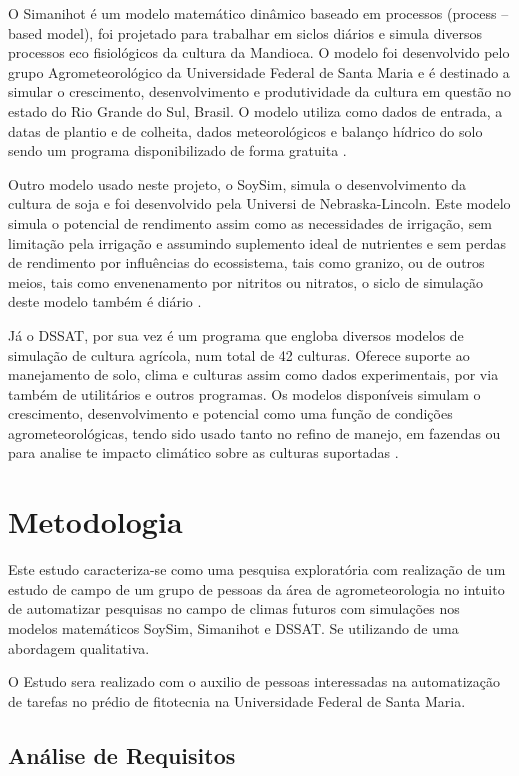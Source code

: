 \documentclass[12pt]{article}
\begin{document}
	O Simanihot é um modelo matemático dinâmico baseado em processos (process – based model), foi projetado para trabalhar em siclos diários e simula diversos processos eco fisiológicos da cultura da Mandioca. O modelo foi desenvolvido pelo grupo Agrometeorológico da Universidade Federal de Santa Maria e é destinado a simular o crescimento, desenvolvimento e produtividade da cultura em questão no estado do Rio Grande do Sul, Brasil. O modelo utiliza como dados de entrada, a datas de plantio e de colheita, dados meteorológicos e balanço hídrico do solo sendo um programa disponibilizado de forma gratuita \cite{Simanihot}.

	Outro modelo usado neste projeto, o SoySim, simula o desenvolvimento da cultura de soja e foi desenvolvido pela Universi de Nebraska-Lincoln. Este modelo simula o potencial de rendimento assim como as necessidades de irrigação, sem limitação pela irrigação e assumindo suplemento ideal de nutrientes e sem perdas de rendimento por influências do ecossistema, tais como granizo, ou de outros meios, tais como envenenamento por nitritos ou nitratos, o siclo de simulação deste modelo também é diário \cite{SoySim}.
	
	Já o DSSAT, por sua vez é um programa que engloba diversos modelos de simulação de cultura agrícola, num total de 42 culturas. Oferece suporte ao manejamento de solo, clima e culturas assim como dados experimentais, por via também de utilitários e outros programas. Os modelos disponíveis simulam o crescimento, desenvolvimento e potencial como uma função de condições agrometeorológicas, tendo sido usado tanto no refino de manejo, em fazendas ou para analise te impacto climático sobre as culturas suportadas \cite{dssat}.
	
	
	\section{Metodologia}
	
	Este estudo caracteriza-se como uma pesquisa exploratória com realização de um estudo de campo de um grupo de pessoas da área de agrometeorologia no intuito de automatizar pesquisas no campo de climas futuros com simulações nos modelos matemáticos SoySim, Simanihot e DSSAT. Se utilizando de uma abordagem qualitativa.
	
	O Estudo sera realizado com o auxilio de pessoas interessadas na automatização de tarefas no prédio de fitotecnia na Universidade Federal de Santa Maria.

	\subsection{Análise de Requisitos}
	
\end{document}
